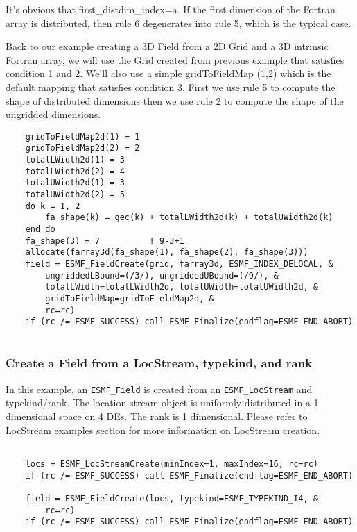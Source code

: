     It's obvious that first\_distdim\_index=a. If the first dimension of the Fortran
    array is distributed, then rule 6 degenerates into rule 5, which is
    the typical case.
  
    Back to our example creating a 3D Field from a 2D Grid and a 3D intrinsic
    Fortran array, we will use the Grid created from previous example
    that satisfies condition 1 and 2. We'll also use a simple gridToFieldMap
    (1,2) which is the default mapping that satisfies condition 3. 
    First we use rule 5 to compute
    the shape of distributed dimensions then we use rule 2 to compute the shape
    of the ungridded dimensions. 

 \begin{verbatim}
    gridToFieldMap2d(1) = 1
    gridToFieldMap2d(2) = 2
    totalLWidth2d(1) = 3
    totalLWidth2d(2) = 4
    totalUWidth2d(1) = 3
    totalUWidth2d(2) = 5
    do k = 1, 2
        fa_shape(k) = gec(k) + totalLWidth2d(k) + totalUWidth2d(k)
    end do
    fa_shape(3) = 7          ! 9-3+1
    allocate(farray3d(fa_shape(1), fa_shape(2), fa_shape(3)))
    field = ESMF_FieldCreate(grid, farray3d, ESMF_INDEX_DELOCAL, &
        ungriddedLBound=(/3/), ungriddedUBound=(/9/), &
        totalLWidth=totalLWidth2d, totalUWidth=totalUWidth2d, &
        gridToFieldMap=gridToFieldMap2d, &
        rc=rc)
    if (rc /= ESMF_SUCCESS) call ESMF_Finalize(endflag=ESMF_END_ABORT)
 
\end{verbatim}
 

  \subsubsection{Create a Field from a LocStream, typekind, and rank}
  \label{sec:field:usage:create_locs_tkr}
   
   In this example, an {\tt ESMF\_Field} is created from an {\tt ESMF\_LocStream} 
   and typekind/rank.
   The location stream object is uniformly distributed
   in a 1 dimensional space on 4 DEs. The rank is 1 dimensional. 
   Please refer to LocStream examples section for more information on LocStream creation.
   

 \begin{verbatim}

    locs = ESMF_LocStreamCreate(minIndex=1, maxIndex=16, rc=rc)
    if (rc /= ESMF_SUCCESS) call ESMF_Finalize(endflag=ESMF_END_ABORT)

    field = ESMF_FieldCreate(locs, typekind=ESMF_TYPEKIND_I4, &
        rc=rc)
    if (rc /= ESMF_SUCCESS) call ESMF_Finalize(endflag=ESMF_END_ABORT)

 
\end{verbatim}
 
